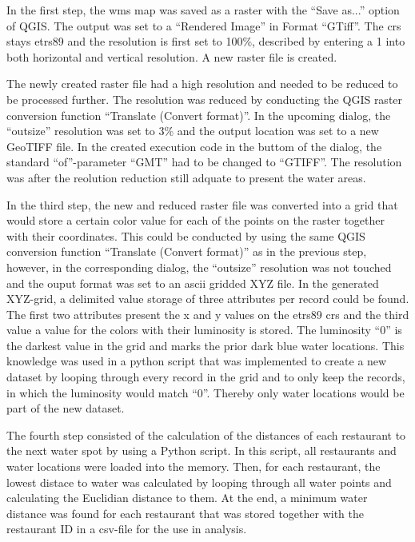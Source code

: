 \documentclass[a4paper, 11pt, oneside]{Thesis}  %
\begin{document}
In the first step, the \ac{wms} map was saved as a raster with the ``Save as...'' option of QGIS. The output was set to a ``Rendered Image'' in Format ``GTiff''. The \ac{crs} stays \ac{etrs89} and the resolution is first set to 100\%, described by entering a 1 into both horizontal and vertical resolution. A new raster file is created.

The newly created raster file had a high resolution and needed to be reduced to be processed further. The resolution was reduced by conducting the QGIS raster conversion function ``Translate (Convert format)''. In the upcoming dialog, the ``outsize'' resolution was set to 3\% and the output location was set to a new GeoTIFF file. In the created execution code in the buttom of the dialog, the standard ``of''-parameter ``GMT'' had to be changed to ``GTIFF''. The resolution was after the reolution reduction still adquate to present the water areas.

In the third step, the new and reduced raster file was converted into a grid that would store a certain color value for each of the points on the raster together with their coordinates. This could be conducted by using the same QGIS conversion function ``Translate (Convert format)'' as in the previous step, however, in the corresponding dialog, the ``outsize'' resolution was not touched and the ouput format was set to an \ac{ascii} gridded XYZ file. In the generated XYZ-grid, a delimited value storage of three attributes per record could be found. The first two attributes present the x and y values on the \ac{etrs89} \ac{crs} and the third value a value for the colors with their luminosity is stored. The luminosity ``0'' is the darkest value in the grid and marks the prior dark blue water locations. This knowledge was used in a python script that was implemented to create a new dataset by looping through every record in the grid and to only keep the records, in which the luminosity would match ``0''. Thereby only water locations would be part of the new dataset.

The fourth step consisted of the calculation of the distances of each restaurant to the next water spot by using a Python script. In this script, all restaurants and water locations were loaded into the memory. Then, for each restaurant, the lowest distace to water was calculated by looping through all water points and calculating the Euclidian distance to them. At the end, a minimum water distance was found for each restaurant that was stored together with the restaurant ID in a \ac{csv}-file for the use in analysis.
\end{document}
